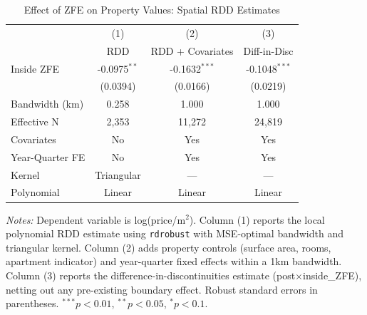 \begin{table}[htbp]
\centering
\caption{Effect of ZFE on Property Values: Spatial RDD Estimates}
\label{tab:main}
\begin{tabular}{lccc}
\toprule
 & (1) & (2) & (3) \\
 & RDD & RDD + Covariates & Diff-in-Disc \\
\midrule
Inside ZFE & -0.0975$^{**}$ & -0.1632$^{***}$ & -0.1048$^{***}$ \\
 & (0.0394) & (0.0166) & (0.0219) \\
[0.5em]
Bandwidth (km) & 0.258 & 1.000 & 1.000 \\
Effective N & 2,353 & 11,272 & 24,819 \\
Covariates & No & Yes & Yes \\
Year-Quarter FE & No & Yes & Yes \\
Kernel & Triangular & --- & --- \\
Polynomial & Linear & Linear & Linear \\
\bottomrule
\end{tabular}
\begin{tablenotes}[flushleft]\small
\item \textit{Notes:} Dependent variable is log(price/m$^2$). Column (1) reports the local polynomial RDD estimate using \texttt{rdrobust} with MSE-optimal bandwidth and triangular kernel. Column (2) adds property controls (surface area, rooms, apartment indicator) and year-quarter fixed effects within a 1km bandwidth. Column (3) reports the difference-in-discontinuities estimate (post$\times$inside\_ZFE), netting out any pre-existing boundary effect. Robust standard errors in parentheses. $^{***}p<0.01$, $^{**}p<0.05$, $^{*}p<0.1$.
\end{tablenotes}
\end{table}

